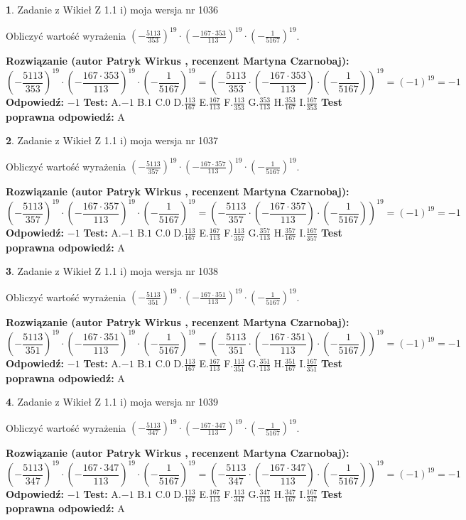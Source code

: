 \documentclass[12pt, a4paper]{article}
\theoremstyle{definition} %
\newtheorem{zad}{}
\newcommand{\zadStart}[1]{\begin{zad}#1\newline}
\newcommand{\zadStop}{\end{zad}}
\newcommand{\rozwStart}[2]{\noindent \textbf{Rozwiązanie (autor #1 , recenzent #2): }\newline}
\newcommand{\rozwStop}{\newline}
\newcommand{\odpStart}{\noindent \textbf{Odpowiedź:}\newline}
\newcommand{\odpStop}{\newline}
\newcommand{\testStart}{\noindent \textbf{Test:}\newline}
\newcommand{\testStop}{\newline}
\newcommand{\kluczStart}{\noindent \textbf{Test poprawna odpowiedź:}\newline}
\newcommand{\kluczStop}{\newline}
\begin{document}
\zadStart{Zadanie z Wikieł Z 1.1 i) moja wersja nr 1036}

Obliczyć wartość wyrażenia $(-\frac{5113}{353})^{19} \cdot (-\frac{167 \cdot 353}{113})^{19} \cdot (-\frac{1}{5167})^{19}$.
\zadStop
\rozwStart{Patryk Wirkus}{Martyna Czarnobaj}
$$(-\frac{5113}{353})^{19} \cdot (-\frac{167 \cdot 353}{113})^{19} \cdot (-\frac{1}{5167})^{19} = (-\frac{5113}{353} \cdot (-\frac{167 \cdot 353}{113}) \cdot (-\frac{1}{5167}))^{19} = (-1)^{19} = -1$$
\rozwStop
\odpStart
$-1$
\odpStop
\testStart
A.$-1$ B.$1$ C.$0$ D.$\frac{113}{167}$ E.$\frac{167}{113}$
F.$\frac{113}{353}$ G.$\frac{353}{113}$
H.$\frac{353}{167}$
I.$\frac{167}{353}$
\testStop
\kluczStart
A
\kluczStop



\zadStart{Zadanie z Wikieł Z 1.1 i) moja wersja nr 1037}

Obliczyć wartość wyrażenia $(-\frac{5113}{357})^{19} \cdot (-\frac{167 \cdot 357}{113})^{19} \cdot (-\frac{1}{5167})^{19}$.
\zadStop
\rozwStart{Patryk Wirkus}{Martyna Czarnobaj}
$$(-\frac{5113}{357})^{19} \cdot (-\frac{167 \cdot 357}{113})^{19} \cdot (-\frac{1}{5167})^{19} = (-\frac{5113}{357} \cdot (-\frac{167 \cdot 357}{113}) \cdot (-\frac{1}{5167}))^{19} = (-1)^{19} = -1$$
\rozwStop
\odpStart
$-1$
\odpStop
\testStart
A.$-1$ B.$1$ C.$0$ D.$\frac{113}{167}$ E.$\frac{167}{113}$
F.$\frac{113}{357}$ G.$\frac{357}{113}$
H.$\frac{357}{167}$
I.$\frac{167}{357}$
\testStop
\kluczStart
A
\kluczStop



\zadStart{Zadanie z Wikieł Z 1.1 i) moja wersja nr 1038}

Obliczyć wartość wyrażenia $(-\frac{5113}{351})^{19} \cdot (-\frac{167 \cdot 351}{113})^{19} \cdot (-\frac{1}{5167})^{19}$.
\zadStop
\rozwStart{Patryk Wirkus}{Martyna Czarnobaj}
$$(-\frac{5113}{351})^{19} \cdot (-\frac{167 \cdot 351}{113})^{19} \cdot (-\frac{1}{5167})^{19} = (-\frac{5113}{351} \cdot (-\frac{167 \cdot 351}{113}) \cdot (-\frac{1}{5167}))^{19} = (-1)^{19} = -1$$
\rozwStop
\odpStart
$-1$
\odpStop
\testStart
A.$-1$ B.$1$ C.$0$ D.$\frac{113}{167}$ E.$\frac{167}{113}$
F.$\frac{113}{351}$ G.$\frac{351}{113}$
H.$\frac{351}{167}$
I.$\frac{167}{351}$
\testStop
\kluczStart
A
\kluczStop



\zadStart{Zadanie z Wikieł Z 1.1 i) moja wersja nr 1039}

Obliczyć wartość wyrażenia $(-\frac{5113}{347})^{19} \cdot (-\frac{167 \cdot 347}{113})^{19} \cdot (-\frac{1}{5167})^{19}$.
\zadStop
\rozwStart{Patryk Wirkus}{Martyna Czarnobaj}
$$(-\frac{5113}{347})^{19} \cdot (-\frac{167 \cdot 347}{113})^{19} \cdot (-\frac{1}{5167})^{19} = (-\frac{5113}{347} \cdot (-\frac{167 \cdot 347}{113}) \cdot (-\frac{1}{5167}))^{19} = (-1)^{19} = -1$$
\rozwStop
\odpStart
$-1$
\odpStop
\testStart
A.$-1$ B.$1$ C.$0$ D.$\frac{113}{167}$ E.$\frac{167}{113}$
F.$\frac{113}{347}$ G.$\frac{347}{113}$
H.$\frac{347}{167}$
I.$\frac{167}{347}$
\testStop
\kluczStart
A
\kluczStop
\end{document}
